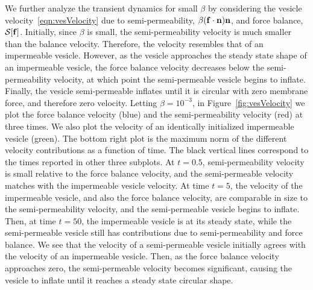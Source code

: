 \documentclass[9pt,twocolumn,twoside,lineno]{pnas-new}
\begin{document}
We further analyze the transient dynamics for small $\beta$ by
considering the vesicle velocity~\eqref{eqn:vesVelocity} due to
semi-permeability, $\beta(\mathbf{f} \cdot \mathbf{n})\mathbf{n}$, and force balance,
$\mathcal{S}[\mathbf{f}]$. Initially, since $\beta$ is small, the semi-permeability velocity is much
smaller than the balance velocity. Therefore,
the velocity resembles that of an impermeable vesicle. However, as the
vesicle approaches the steady state shape of an impermeable vesicle, the
force balance velocity decreases below the semi-permeability velocity,
at which point the semi-permeable vesicle begins to inflate.  Finally,
the vesicle semi-permeable inflates until it is circular with zero
membrane force, and therefore zero velocity.  Letting $\beta = 10^{-3}$,
in Figure~\ref{fig:vesVelocity} we plot the force balance velocity
(blue) and the semi-permeability velocity (red) at three times. We also
plot the velocity of an identically initialized impermeable vesicle
(green). The bottom right plot is the maximum norm of the different
velocity contributions as a function of time. The black vertical lines
correspond to the times reported in other three subplots. At $t=0.5$, semi-permeability velocity is small relative to the
force balance velocity, and the semi-permeable velocity matches with the
impermeable vesicle velocity. At time $t=5$, the velocity of the
impermeable vesicle, and also the force balance velocity, are comparable
in size to the semi-permeability velocity, and the semi-permeable
vesicle begins to inflate. Then, at time $t=50$, the impermeable vesicle
is at its steady state, while the semi-permeable vesicle still has
contributions due to semi-permeability and force balance. We see that
the velocity of a semi-permeable vesicle initially agrees with the
velocity of an impermeable vesicle. Then, as the force balance velocity
approaches zero, the semi-permeable velocity becomes significant,
causing the vesicle to inflate until it reaches a steady state circular
shape.
\end{document}
